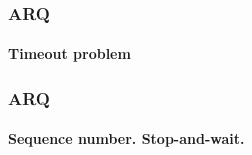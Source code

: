 \begin{frame}		
	\frametitle{ARQ}
	\framesubtitle{Timeout problem}
	\begin{figure}[H]
	\end{figure}
\end{frame}

\begin{frame}		
	\frametitle{ARQ}
	\framesubtitle{Sequence number. Stop-and-wait.}
	\begin{figure}[H]
	\end{figure}
\end{frame}
